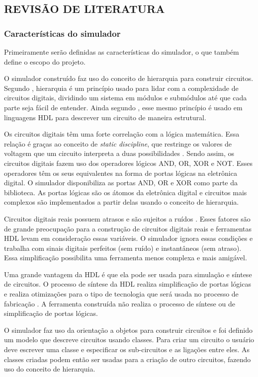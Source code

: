 \subsection{REVISÃO DE LITERATURA}
\subsubsection{Características do simulador}
Primeiramente serão definidas as características do simulador, o que também define o escopo do projeto.

O simulador construído faz uso do conceito de hierarquia para construir circuitos.
Segundo \textcite{harris}, hierarquia é um princípio usado para lidar com a complexidade de circuitos digitais, dividindo um sistema em módulos e submódulos até que cada parte seja fácil de entender.
Ainda segundo \textcite{harris}, esse mesmo princípio é usado em linguagens HDL para descrever um circuito de maneira estrutural.

Os circuitos digitais têm uma forte correlação com a lógica matemática.
Essa relação é graças ao conceito de \emph{static discipline}, que restringe os valores de voltagem que um circuito interpreta a duas possibilidades \cite{kaufman}.
Sendo assim, os circuitos digitais fazem uso dos operadores lógicos AND, OR, XOR e NOT.
Esses operadores têm os seus equivalentes na forma de portas lógicas na eletrônica digital.
O simulador disponibiliza as portas AND, OR e XOR como parte da biblioteca.
As portas lógicas são os átomos da eletrônica digital e circuitos mais complexos são implementados a partir delas usando o conceito de hierarquia.

Circuitos digitais reais possuem atrasos e são sujeitos a ruídos \cite{kaufman}.
Esses fatores são de grande preocupação para a construção de circuitos digitais reais e ferramentas HDL levam em consideração essas variáveis.
O simulador ignora essas condições e trabalha com sinais digitais perfeitos (sem ruído) e instantâneos (sem atraso).
Essa simplificação possibilita uma ferramenta menos complexa e mais amigável.

Uma grande vantagem da HDL é que ela pode ser usada para simulação e síntese de circuitos.
O processo de síntese da HDL realiza simplificação de portas lógicas e realiza otimizações para o tipo de tecnologia que será usada no processo de fabricação \cite{harris}.
A ferramenta construída não realiza o processo de síntese ou de simplificação de portas lógicas.

O simulador faz uso da orientação a objetos para construir circuitos e foi definido um modelo que descreve circuitos usando classes.
Para criar um circuito o usuário deve escrever uma classe e especificar os sub-circuitos e as ligações entre eles.
As classes criadas podem então ser usadas para a criação de outro circuitos, fazendo uso do conceito de hierarquia.


